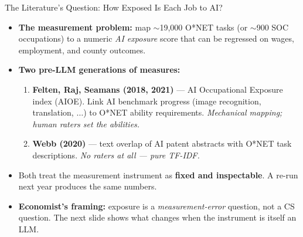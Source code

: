 \begin{frame}{The Literature's Question: How Exposed Is Each Job to AI?}
\begin{itemize}
\item \textbf{The measurement problem:} map $\sim$19{,}000 O*NET tasks (or $\sim$900 SOC occupations) to a numeric \emph{AI exposure} score that can be regressed on wages, employment, and county outcomes.

\medskip
\item \textbf{Two pre-LLM generations of measures:}
\begin{enumerate}
\item \textbf{Felten, Raj, Seamans (2018, 2021)} --- AI Occupational Exposure index (AIOE). Link AI benchmark progress (image recognition, translation, $\ldots$) to O*NET ability requirements. \emph{Mechanical mapping; human raters set the abilities.}
\item \textbf{Webb (2020)} --- text overlap of AI patent abstracts with O*NET task descriptions. \emph{No raters at all --- pure TF-IDF.}
\end{enumerate}

\medskip
\item Both treat the measurement instrument as \textbf{fixed and inspectable}. A re-run next year produces the same numbers.

\medskip
\item \textbf{Economist's framing:} exposure is a \emph{measurement-error} question, not a CS question. The next slide shows what changes when the instrument is itself an LLM.
\end{itemize}
\end{frame}

